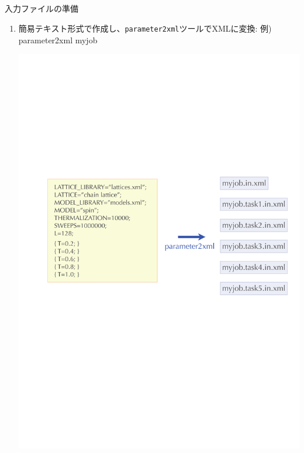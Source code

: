 \subsection*{\redm\whiteb\greenb}
\begin{frame}[t,fragile]{入力ファイルの準備}
  \begin{enumerate}
    \setlength{\itemsep}{1em}
    \setcounter{enumi}{1}
  \item 簡易テキスト形式で作成し、{\tt parameter2xml}ツールでXMLに変換: 例) parameter2xml myjob
    \begin{center}
      \includegraphics[height=.6\textheight]{simulation4.pdf}
    \end{center}
  \end{enumerate}
\end{frame}

